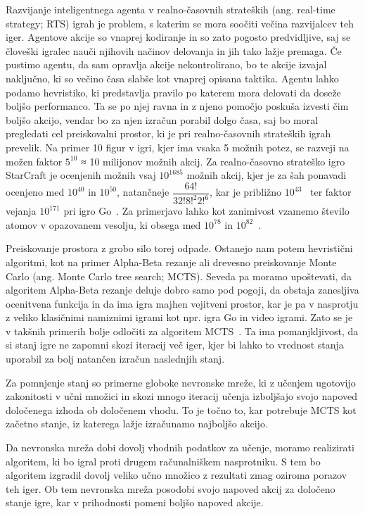 \documentclass[a4paper, 12pt]{book}
\begin{document}
Razvijanje inteligentnega agenta v realno-časovnih strateških (ang. real-time strategy; RTS) igrah je problem, s katerim se mora soočiti večina razvijalcev teh iger. 
Agentove akcije so vnaprej kodiranje in so zato pogosto predvidljive, saj se človeški igralec nauči njihovih načinov delovanja in jih tako lažje premaga.
Če pustimo agentu, da sam opravlja akcije nekontrolirano, bo te akcije izvajal naključno, ki so večino časa slabše kot vnaprej opisana taktika.
Agentu lahko podamo hevristiko, ki predstavlja pravilo po katerem mora delovati da doseže boljšo performanco.
Ta se po njej ravna in z njeno pomočjo poskuša izvesti čim boljšo akcijo, vendar bo za njen izračun porabil dolgo časa, saj bo moral pregledati cel preiskovalni prostor, ki je pri realno-časovnih strateških igrah prevelik.
Na primer 10 figur v igri, kjer ima vsaka 5 možnih potez, se razveji na možen faktor $5^{10}$ ≈ 10 milijonov možnih akcij.
Za realno-časovno strateško igro StarCraft je ocenjenih možnih vsaj $10^{1685}$ možnih akcij, kjer je za šah ponavadi ocenjeno med $10^{40}$ in $10^{50}$, natančneje $\dfrac{64!}{32!8!^{2}2!^{6}}$, kar je približno $10^{43}$~\cite{wiki:Shannon_number} ter faktor vejanja $10^{171}$ pri igro Go~\cite{ontanon2017combinatorial}.
Za primerjavo lahko kot zanimivost vzamemo število atomov v opazovanem vesolju, ki obsega med $10^{78}$ in $10^{82}$~\cite{atoms}.

Preiskovanje prostora z grobo silo torej odpade. 
Ostanejo nam potem hevristični algoritmi, kot na primer Alpha-Beta rezanje ali drevesno preiskovanje Monte Carlo (ang. Monte Carlo tree search; MCTS). 
Seveda pa moramo upoštevati, da algoritem Alpha-Beta rezanje deluje dobro samo pod pogoji, da obstaja zanesljiva ocenitvena funkcija in da ima igra majhen vejitveni prostor, kar je pa v nasprotju z veliko klasičnimi namiznimi igrami kot npr. igra Go in video igrami. 
Zato se je v takšnih primerih bolje odločiti za algoritem MCTS~\cite{chaslot2008monte}.
Ta ima pomanjkljivost, da si stanj igre ne zapomni skozi iteracij več iger, kjer bi lahko to vrednost stanja uporabil za bolj natančen izračun naslednjih stanj.

Za pomnjenje stanj so primerne globoke nevronske mreže, ki z učenjem ugotovijo zakonitosti v učni množici in skozi mnogo iteracij učenja izboljšajo svojo napoved določenega izhoda ob določenem vhodu. 
To je točno to, kar potrebuje MCTS kot začetno stanje, iz katerega lažje izračunamo najboljšo akcijo.

Da nevronska mreža dobi dovolj vhodnih podatkov za učenje, moramo realizirati algoritem, ki bo igral proti drugem računalniškem nasprotniku.
S tem bo algoritem izgradil dovolj veliko učno množico z rezultati zmag oziroma porazov teh iger. 
Ob tem nevronska mreža posodobi svojo napoved akcij za določeno stanje igre, kar v prihodnosti pomeni boljšo napoved akcije.
\end{document}
